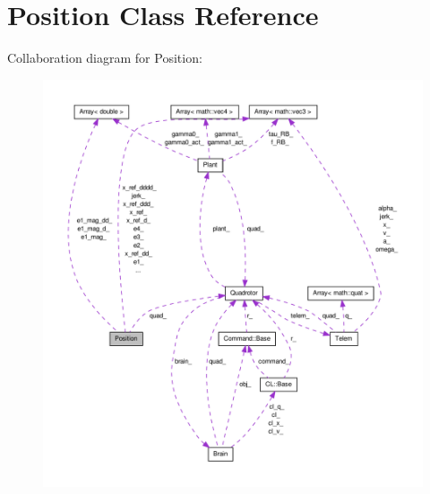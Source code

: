 \hypertarget{classPosition}{\section{\-Position \-Class \-Reference}
\label{classPosition}
}


\-Collaboration diagram for \-Position\-:\nopagebreak
\begin{figure}[H]
\begin{center}
\leavevmode
\includegraphics[width=350pt]{classPosition__coll__graph}
\end{center}
\end{figure}
